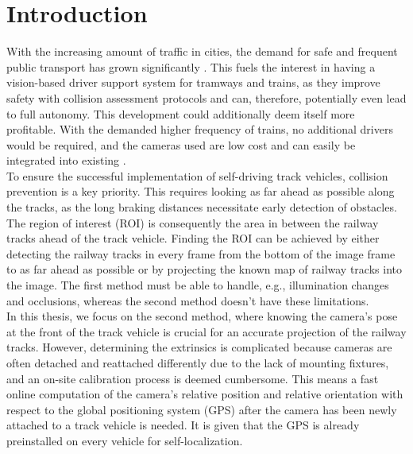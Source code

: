 \chapter{Introduction}
\label{sec:introduction}

With the increasing amount of traffic in cities, the demand for safe and frequent public transport has grown significantly \citep{dell2011quality}. This fuels the interest in having a vision-based driver support system for tramways and trains, as they improve safety with collision assessment protocols and can, therefore, potentially even lead to full autonomy. This development could additionally deem itself more profitable. With the demanded higher frequency of trains, no additional drivers would be required, and the cameras used are low cost and can easily be integrated into existing  \citep{trentesaux2018autonomous}.\\

To ensure the successful implementation of self-driving track vehicles, collision prevention is a key priority. This requires looking as far ahead as possible along the tracks, as the long braking distances necessitate early detection of obstacles. The region of interest (ROI) is consequently the area in between the railway tracks ahead of the track vehicle. Finding the ROI can be achieved by either detecting the railway tracks in every frame from the bottom of the image frame to as far ahead as possible or by projecting the known map of railway tracks into the image. The first method must be able to handle, e.g., illumination changes and occlusions, whereas the second method doesn't have these limitations.\\ 

In this thesis, we focus on the second method, where knowing the camera's pose at the front of the track vehicle is crucial for an accurate projection of the railway tracks. However, determining the extrinsics is complicated because cameras are often detached and reattached differently due to the lack of mounting fixtures, and an on-site calibration process is deemed cumbersome. This means a fast online computation of the camera's relative position and relative orientation with respect to the global positioning system (GPS) after the camera has been newly attached to a track vehicle is needed. It is given that the GPS is already preinstalled on every vehicle for self-localization. \\

